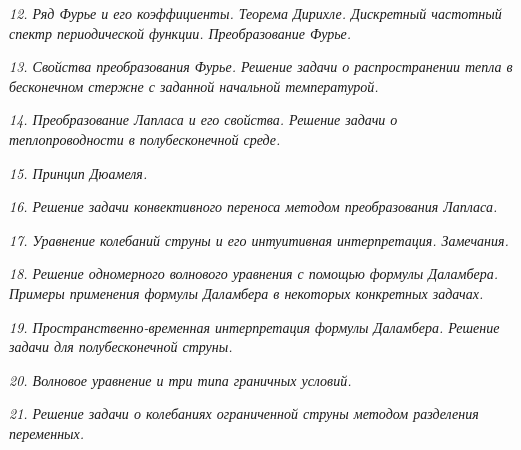 \newpage %

\emph{12. Ряд Фурье и его коэффициенты. Теорема Дирихле. Дискретный частотный
спектр периодической функции. Преобразование Фурье.}

\newpage %

\emph{13. Свойства преобразования Фурье. Решение задачи о распространении тепла
в бесконечном стержне с заданной начальной температурой.}

\newpage %

\emph{14. Преобразование Лапласа и его свойства. Решение задачи о
теплопроводности в полубесконечной среде.}

\newpage %

\emph{15. Принцип Дюамеля.}

\newpage %

\emph{16. Решение задачи конвективного переноса методом преобразования Лапласа.}

\newpage %

\emph{17. Уравнение колебаний струны и его интуитивная интерпретация.
Замечания.}

\newpage %

\emph{18. Решение одномерного волнового уравнения с помощью формулы Даламбера.
Примеры применения формулы Даламбера в некоторых конкретных задачах.}

\newpage %

\emph{19. Пространственно-временная интерпретация формулы Даламбера. Решение
задачи для полубесконечной струны.}

\newpage %

\emph{20. Волновое уравнение и три типа граничных условий.}

\newpage %

\emph{21. Решение задачи о колебаниях ограниченной струны методом разделения
переменных.}

